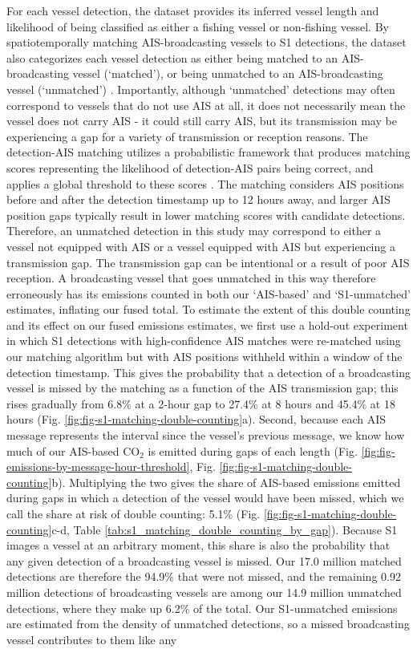 \documentclass[lineno,pdflatex,sn-nature]{sn-jnl}
\begin{document}
For each vessel detection, the dataset provides its inferred vessel length and likelihood of being classified as either a fishing vessel or non-fishing vessel. By spatiotemporally matching AIS-broadcasting vessels to S1 detections, the dataset also categorizes each vessel detection as either being matched to an AIS-broadcasting vessel (`matched'), or being unmatched to an AIS-broadcasting vessel (`unmatched') \cite{kroodsma2022revealing,paolo2024satellite}. Importantly, although `unmatched' detections may often correspond to vessels that do not use AIS at all, it does not necessarily mean the vessel does not carry AIS - it could still carry AIS, but its transmission may be experiencing a gap for a variety of transmission or reception reasons. The detection-AIS matching utilizes a probabilistic framework that produces matching scores representing the likelihood of detection-AIS pairs being correct, and applies a global threshold to these scores \cite{kroodsma2022revealing,paolo2024satellite}. The matching considers AIS positions before and after the detection timestamp up to 12 hours away, and larger AIS position gaps typically result in lower matching scores with candidate detections. Therefore, an unmatched detection in this study may correspond to either a vessel not equipped with AIS or a vessel equipped with AIS but experiencing a transmission gap. The transmission gap can be intentional or a result of poor AIS reception. A broadcasting vessel that goes unmatched in this way therefore erroneously has its emissions counted in both our `AIS-based' and `S1-unmatched' estimates, inflating our fused total. To estimate the extent of this double counting and its effect on our fused emissions estimates, we first use a hold-out experiment in which S1 detections with high-confidence AIS matches were re-matched using our matching algorithm but with AIS positions withheld within a window of the detection timestamp. This gives the probability that a detection of a broadcasting vessel is missed by the matching as a function of the AIS transmission gap; this rises gradually from 6.8\% at a 2-hour gap to 27.4\% at 8 hours and 45.4\% at 18 hours (Fig. \ref{fig:fig-s1-matching-double-counting}a). Second, because each AIS message represents the interval since the vessel's previous message, we know how much of our AIS-based CO$_{2}$ is emitted during gaps of each length (Fig. \ref{fig:fig-emissions-by-message-hour-threshold}, Fig. \ref{fig:fig-s1-matching-double-counting}b). Multiplying the two gives the share of AIS-based emissions emitted during gaps in which a detection of the vessel would have been missed, which we call the share at risk of double counting: 5.1\% (Fig. \ref{fig:fig-s1-matching-double-counting}c-d, Table \ref{tab:s1_matching_double_counting_by_gap}). Because S1 images a vessel at an arbitrary moment, this share is also the probability that any given detection of a broadcasting vessel is missed. Our 17.0 million matched detections are therefore the 94.9\% that were not missed, and the remaining 0.92 million detections of broadcasting vessels are among our 14.9 million unmatched detections, where they make up 6.2\% of the total. Our S1-unmatched emissions are estimated from the density of unmatched detections, so a missed broadcasting vessel contributes to them like any 
\end{document}
